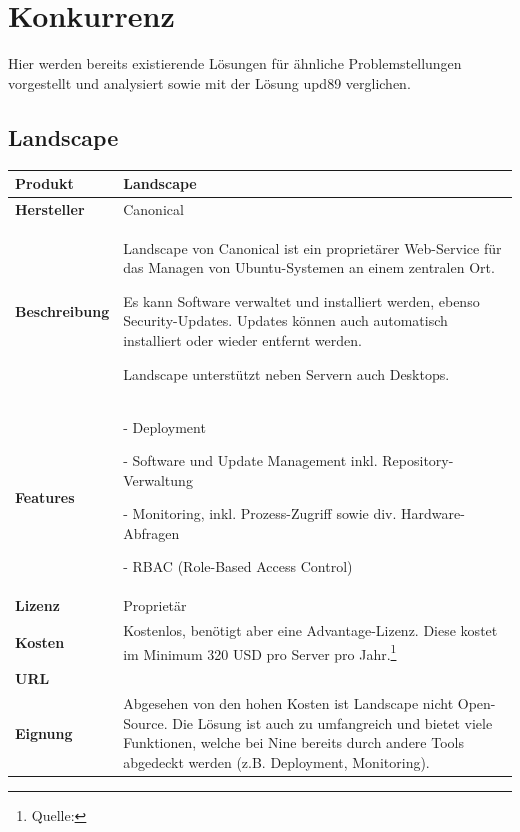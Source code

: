 \section{Konkurrenz} \label{sec:analysis:competition}

Hier werden bereits existierende Lösungen für ähnliche Problemstellungen vorgestellt und analysiert sowie mit der Lösung \gls{upd89} verglichen.

\newcommand{\competitor}[8]{
	\begin{tabularx}{\linewidth}{lX}
		\toprule
		\textbf{Produkt} & #1\\
		\midrule
		\textbf{Hersteller} & #2\\
		\textbf{Beschreibung} & #3\\
		\textbf{Features} & #4\\
        \textbf{Lizenz} & #5\\
		\textbf{Kosten} & #6\\
        \textbf{URL} & #7\\
        \textbf{Eignung} & #8\\
		\bottomrule
	\end{tabularx}
}

\subsection*{Landscape}

\competitor{Landscape}
{Canonical}
{Landscape von Canonical ist ein proprietärer Web-Service für das Managen von Ubuntu-Systemen an einem zentralen Ort.

Es kann Software verwaltet und installiert werden, ebenso Security-Updates. Updates können auch automatisch installiert oder wieder entfernt werden.

Landscape unterstützt neben Servern auch Desktops.}
{
- Deployment

- Software und Update Management inkl. Repository-Verwaltung

- Monitoring, inkl. Prozess-Zugriff sowie div. Hardware-Abfragen

- RBAC (Role-Based Access Control)
}
{Proprietär}
{Kostenlos, benötigt aber eine Advantage-Lizenz. Diese kostet im Minimum 320 USD pro Server pro Jahr.\footnote{Quelle: \purl{http://www.ubuntu.com/management/ubuntu-advantage}}}
{\purl{https://landscape.canonical.com/}}
{Abgesehen von den hohen Kosten ist Landscape nicht Open-Source. Die Lösung ist auch zu umfangreich und bietet viele Funktionen, welche bei Nine bereits durch andere Tools abgedeckt werden (z.B. Deployment, Monitoring).}

